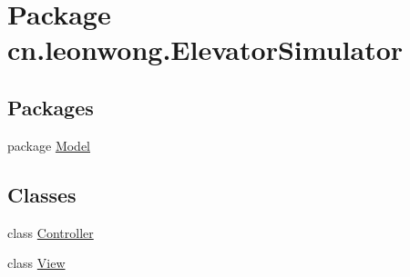 \hypertarget{namespacecn_1_1leonwong_1_1_elevator_simulator}{}\section{Package cn.\+leonwong.\+Elevator\+Simulator}
\label{namespacecn_1_1leonwong_1_1_elevator_simulator}
\subsection*{Packages}
\begin{DoxyCompactItemize}
\item 
package \hyperlink{namespacecn_1_1leonwong_1_1_elevator_simulator_1_1_model}{Model}
\end{DoxyCompactItemize}
\subsection*{Classes}
\begin{DoxyCompactItemize}
\item 
class \hyperlink{classcn_1_1leonwong_1_1_elevator_simulator_1_1_controller}{Controller}
\item 
class \hyperlink{classcn_1_1leonwong_1_1_elevator_simulator_1_1_view}{View}
\end{DoxyCompactItemize}
